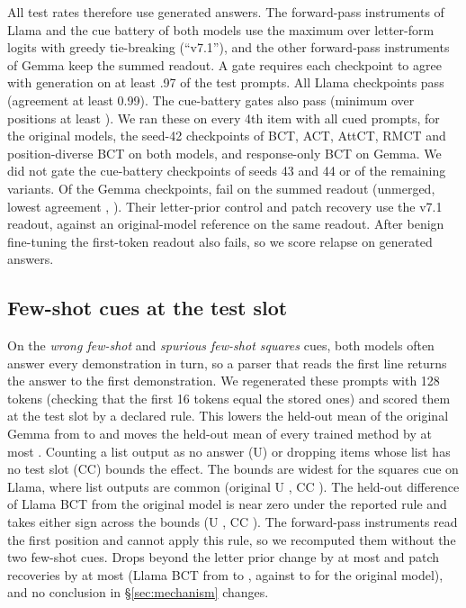 \documentclass[11pt]{article}
\newcommand{\gemma}{Gemma}\newcommand{\gemmafull}{Gemma-2-2B-it}
\newcommand{\llama}{Llama}\newcommand{\llamafull}{Llama-3.1-8B-Instruct}
\begin{document}
All test rates therefore use generated answers. The forward-pass instruments of \llama{} and the cue battery of both models use the maximum over letter-form logits with greedy tie-breaking (``v7.1''), and the other forward-pass instruments of \gemma{} keep the summed readout. A gate requires each checkpoint to agree with generation on at least .97 of the test prompts. All \vLlaGateN{} \llama{} checkpoints pass (agreement at least 0.99). The \vGenGateN{} cue-battery gates also pass (minimum over positions at least \vGenGateMin). We ran these on every 4th item with all cued prompts, for the original models, the seed-42 checkpoints of BCT, ACT, AttCT, RMCT and position-diverse BCT on both models, and response-only BCT on \gemma. We did not gate the cue-battery checkpoints of seeds 43 and 44 or of the remaining variants. Of the \vGemGateN{} \gemma{} checkpoints, \vGemGateNFails{} fail on the summed readout (unmerged, lowest agreement \vGemGateMin, \vGemGateFailList). Their letter-prior control and patch recovery use the v7.1 readout, against an original-model reference on the same readout. After benign fine-tuning the first-token readout also fails, so we score relapse on generated answers.

\subsection{Few-shot cues at the test slot}
\label{app:fewshot}
On the \emph{wrong few-shot} and \emph{spurious few-shot squares} cues, both models often answer every demonstration in turn, so a parser that reads the first line returns the answer to the first demonstration. We regenerated these prompts with 128 tokens (checking that the first 16 tokens equal the stored ones) and scored them at the test slot by a declared rule. This lowers the held-out mean of the original \gemma{} from \vFsGemBaseHeldStored{} to \vFsGemBaseHeldCorr{} and moves the held-out mean of every trained method by at most \vFsMaxArmShift. Counting a list output as no answer (U) or dropping items whose list has no test slot (CC) bounds the effect. The bounds are widest for the squares cue on \llama, where list outputs are common (original U \vFsLlaSqU, CC \vFsLlaSqCC). The held-out difference of \llama{} BCT from the original model is near zero under the reported rule and takes either sign across the bounds (U \vFsLlaBctHeldDiffU, CC \vFsLlaBctHeldDiffCC). The forward-pass instruments read the first position and cannot apply this rule, so we recomputed them without the two few-shot cues. Drops beyond the letter prior change by at most \vFsBpdMaxChange{} and patch recoveries by at most \vFsPatchMaxChange{} (\llama{} BCT from \vFsLlaBctPatchAll{} to \vFsLlaBctPatchNoFs, against \vFsLlaBasePatchAll{} to \vFsLlaBasePatchNoFs{} for the original model), and no conclusion in \S\ref{sec:mechanism} changes.
\end{document}
